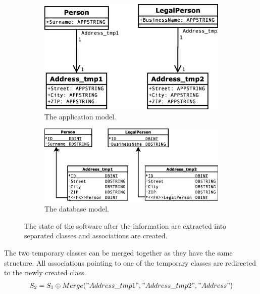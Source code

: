 \documentclass[11pt]{article}
\begin{document}
\begin{figure}
\begin{subfigure}[b]{0.5\textwidth}
	\includegraphics[width=\textwidth]{./images/case_app_5}
	\caption{The application model.}
\end{subfigure}
\begin{subfigure}[b]{0.5\textwidth}
	\includegraphics[width=\textwidth]{./images/case_db_5}
	\caption{The database model.}
\end{subfigure}
	\caption{The state of the software after the information are extracted into separated classes and associations are created.}
	\label{fig:case2}
\end{figure}
The two temporary classes can be merged together as they have the same structure. All associations pointing to one of the temporary classes are redirected to the newly created class.
\begin{align*}
%
%
S_2 &= S_1 \oplus Merge("Address\_tmp1", "Address\_tmp2", "Address") \\
\end{align*}
\end{document}
